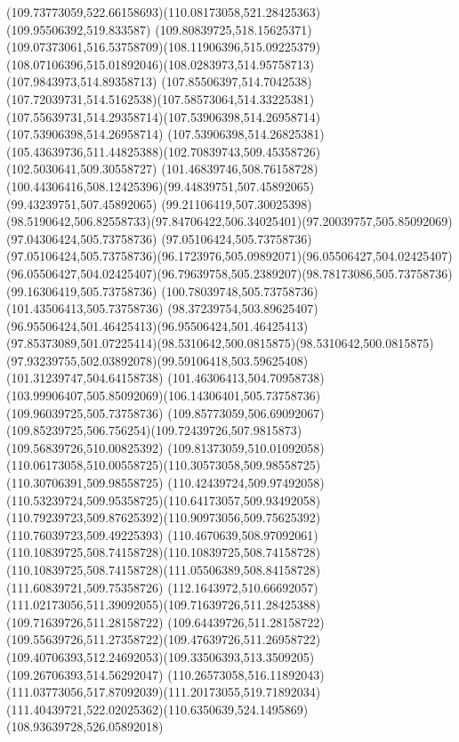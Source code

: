 {{	\curveto(109.73773059,522.66158693)(110.08173058,521.28425363)(109.95506392,519.833587)
	\curveto(109.80839725,518.15625371)(109.07373061,516.53758709)(108.11906396,515.09225379)
	\curveto(108.07106396,515.01892046)(108.0283973,514.95758713)(107.9843973,514.89358713)
	\curveto(107.85506397,514.7042538)(107.72039731,514.5162538)(107.58573064,514.33225381)
	\curveto(107.55639731,514.29358714)(107.53906398,514.26958714)(107.53906398,514.26958714)
	\lineto(107.53906398,514.26825381)
	\curveto(105.43639736,511.44825388)(102.70839743,509.45358726)(102.5030641,509.30558727)
	\curveto(101.46839746,508.76158728)(100.44306416,508.12425396)(99.44839751,507.45892065)
	\lineto(99.43239751,507.45892065)
	\lineto(99.21106419,507.30025398)
	\curveto(98.5190642,506.82558733)(97.84706422,506.34025401)(97.20039757,505.85092069)
	\lineto(97.04306424,505.73758736)
	\lineto(97.05106424,505.73758736)
	\curveto(97.05106424,505.73758736)(96.1723976,505.09892071)(96.05506427,504.02425407)
	\curveto(96.05506427,504.02425407)(96.79639758,505.2389207)(98.78173086,505.73758736)
	\lineto(99.16306419,505.73758736)
	\lineto(100.78039748,505.73758736)
	\lineto(101.43506413,505.73758736)
	\curveto(98.37239754,503.89625407)(96.95506424,501.46425413)(96.95506424,501.46425413)
	\curveto(97.85373089,501.07225414)(98.5310642,500.0815875)(98.5310642,500.0815875)
	\curveto(97.93239755,502.03892078)(99.59106418,503.59625408)(101.31239747,504.64158738)
	\curveto(101.46306413,504.70958738)(103.99906407,505.85092069)(106.14306401,505.73758736)
	\lineto(109.96039725,505.73758736)
	\lineto(109.85773059,506.69092067)
	\curveto(109.85239725,506.756254)(109.72439726,507.9815873)(109.56839726,510.00825392)
	\curveto(109.81373059,510.01092058)(110.06173058,510.00558725)(110.30573058,509.98558725)
	\lineto(110.30706391,509.98558725)
	\curveto(110.42439724,509.97492058)(110.53239724,509.95358725)(110.64173057,509.93492058)
	\curveto(110.79239723,509.87625392)(110.90973056,509.75625392)(110.76039723,509.49225393)
	\curveto(110.4670639,508.97092061)(110.10839725,508.74158728)(110.10839725,508.74158728)
	\curveto(110.10839725,508.74158728)(111.05506389,508.84158728)(111.60839721,509.75358726)
	\curveto(112.1643972,510.66692057)(111.02173056,511.39092055)(109.71639726,511.28425388)
	\lineto(109.71639726,511.28158722)
	\curveto(109.64439726,511.28158722)(109.55639726,511.27358722)(109.47639726,511.26958722)
	\curveto(109.40706393,512.24692053)(109.33506393,513.3509205)(109.26706393,514.56292047)
	\curveto(110.26573058,516.11892043)(111.03773056,517.87092039)(111.20173055,519.71892034)
	\curveto(111.40439721,522.02025362)(110.6350639,524.1495869)(108.93639728,526.05892018)
}}
